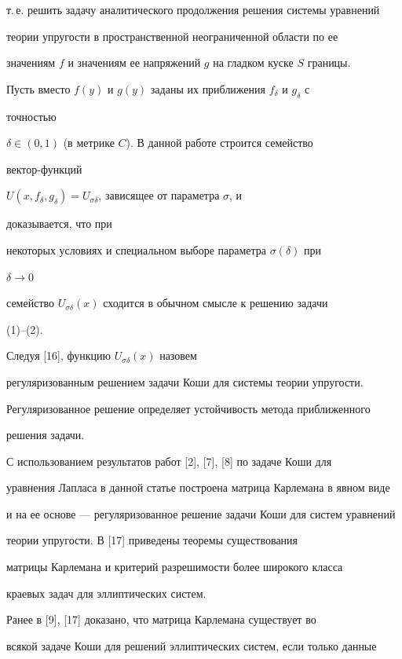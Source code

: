 т.\,е. решить задачу аналитического продолжения решения системы уравнений 


теории упругости в пространственной неограниченной области по ее 


значениям $f$ и значениям ее напряжений $g$ на гладком куске $S$ границы. 


 


Пусть вместо $f(y)$ и $g(y)$ заданы их приближения $f_\delta$ и $g_\delta$ с 


точностью 


$\delta\in(0,1)$ (в метрике $C$). В данной работе строится семейство 


вектор-функций 


$U(x,f_\delta,g_\delta)=U_{\sigma\delta}$, зависящее от параметра $\sigma$, и 


доказывается, что при 


некоторых условиях и специальном выборе параметра $\sigma(\delta)$ при 


$\delta\to0$ 


семейство $U_{\sigma\delta}(x)$ сходится в обычном смысле к решению задачи 


(1)--(2). 


 


Следуя [16], функцию $U_{\sigma\delta}(x)$ назовем 


регуляризованным решением задачи Коши для системы теории упругости. 


Регуляризованное решение определяет устойчивость метода приближенного 


решения задачи. 


 


С использованием результатов работ [2], [7], [8] по задаче Коши для 


уравнения Лапласа в данной статье построена матрица Карлемана в явном виде 


и на ее основе --- регуляризованное решение задачи Коши для систем уравнений 


теории упругости. В [17] приведены теоремы существования 


матрицы Карлемана и критерий разрешимости более широкого класса 


краевых задач для эллиптических систем. 


Ранее в [9], [17] доказано, что матрица Карлемана существует во 


всякой задаче Коши для решений эллиптических систем, если только данные 


